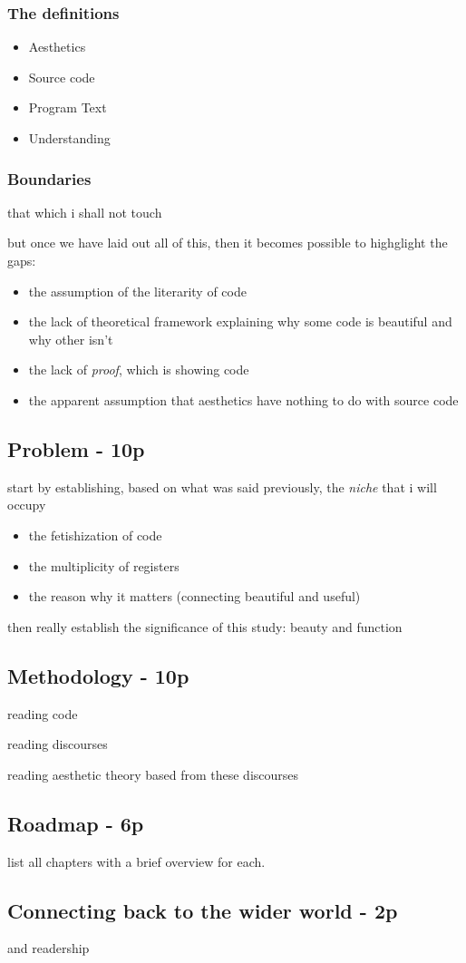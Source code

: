 
\subsubsection{The definitions}

\begin{itemize}
    \item Aesthetics
    \item Source code
    \item Program Text
    \item Understanding
\end{itemize}

\subsubsection{Boundaries}

that which i shall not touch

but once we have laid out all of this, then it becomes possible to highglight the gaps:
\begin{itemize}
    \item the assumption of the literarity of code
    \item the lack of theoretical framework explaining why some code is beautiful and why other isn't
    \item the lack of \emph{proof}, which is showing code
    \item the apparent assumption that aesthetics have nothing to do with source code
\end{itemize}

\subsection{Problem - 10p}

start by establishing, based on what was said previously, the \emph{niche} that i will occupy

\begin{itemize}
    \item the fetishization of code
    \item the multiplicity of registers
    \item the reason why it matters (connecting beautiful and useful)
\end{itemize}

then really establish the significance of this study: beauty and function

\subsection{Methodology - 10p}

reading code

reading discourses

reading aesthetic theory based from these discourses

\subsection{Roadmap - 6p}

list all chapters with a brief overview for each.

\subsection{Connecting back to the wider world - 2p}

and readership